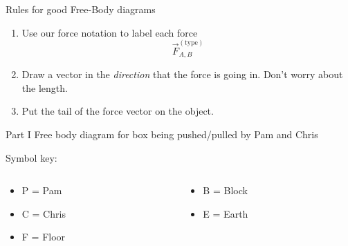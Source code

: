 \documentclass{beamer}
\begin{document}
\begin{frame}
  {Rules for good Free-Body diagrams}
  \begin{enumerate}
    \item Use our force notation to label each force
    \[
      \vec{F}^{(\text{type})}_{A,B}
    \]
    \item Draw a vector in the \textit{direction} that the force is going in. Don't worry about
    the length. 
    \item Put the tail of the force vector on the object.
  \end{enumerate}
\end{frame}

\begin{frame}
  {Part \textrm{I}}
  Free body diagram for box being pushed/pulled by Pam and Chris
  \begin{center}
  \end{center}
  Symbol key:
  \begin{columns}
    \begin{column}{0.5\textwidth}
      \begin{itemize}
        \item P = Pam
        \item C = Chris
        \item F = Floor
      \end{itemize}      
    \end{column}
    \begin{column}{0.5\textwidth}
      \begin{itemize}
        \item B = Block
        \item E = Earth
      \end{itemize}      
    \end{column}
  \end{columns}
\end{frame}
\end{document}

